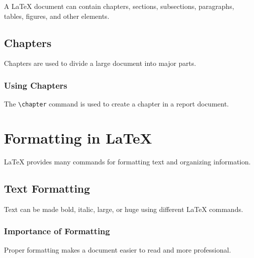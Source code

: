 \documentclass[12pt,a4paper]{report}
\begin{document}
A LaTeX document can contain chapters, sections,
subsections, paragraphs, tables, figures, and other elements.

\section{Chapters}

Chapters are used to divide a large document into major parts.

\subsection{Using Chapters}

The \texttt{\textbackslash chapter} command is used to create
a chapter in a report document.

\chapter{Formatting in LaTeX}

LaTeX provides many commands for formatting text and organizing information.

\section{Text Formatting}

Text can be made bold, italic, large, or huge using
different LaTeX commands.

\subsection{Importance of Formatting}

Proper formatting makes a document easier to read and more professional.
\end{document}
